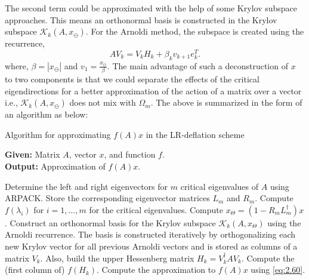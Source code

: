 The second term could be approximated with the help of some Krylov subspace approaches. This means an orthonormal basis is constructed in the Krylov subspace $\mathcal{K}_{k}(A,x_{\ominus})$. For the Arnoldi method, the subspace is created using the recurrence,
\begin{equation}
    AV_{k} = V_{k} H_{k} + \beta_{k} v_{k+1} e_{k}^{T}.
    \label{eq:2.62}
\end{equation}
where, $\beta = |x_{\ominus}|$ and $v_{1} = \frac{x_{\ominus}}{\beta}$. The main advantage of such a deconstruction of $x$ to two components is that we could separate the effects of the critical eigendirections for a better approximation of the action of a matrix over a vector i.e., $\mathcal{K}_{k}(A,x_{\ominus})$ does not mix with $\Omega_{m}$. The above is summarized in the form of an algorithm as below:

\begin{algorithm}[H]
    \caption{Algorithm for approximating $f(A)x$ in the LR-deflation scheme \cite{11}}
    \label{alg:lr_deflation}
    \textbf{Given:} Matrix $A$, vector $x$, and function $f$.\\
    \textbf{Output:} Approximation of $f(A)x$.
    \begin{algorithmic}[1]
        \STATE Determine the left and right eigenvectors for $m$ critical eigenvalues of $A$ using ARPACK. Store the corresponding eigenvector matrices $L_m$ and $R_m$.
        \STATE Compute $f(\lambda_i)$ for $i = 1, \dots, m$ for the critical eigenvalues.
        \STATE Compute $x_{\Theta} = \left(1 - R_m L_m^{\dagger} \right) x$.
        \STATE Construct an orthonormal basis for the Krylov subspace $\mathcal{K}_k(A, x_\Theta)$ using the Arnoldi recurrence. The basis is constructed iteratively by orthogonalizing each new Krylov vector for all previous Arnoldi vectors and is stored as columns of a matrix $V_k$. Also, build the upper Hessenberg matrix $H_k = V_k^{\dagger} A V_k$.
        \STATE Compute the (first column of) $f(H_k)$.
        \STATE Compute the approximation to $f(A)x$ using \eqref{eq:2.60}.
    \end{algorithmic}
\end{algorithm}